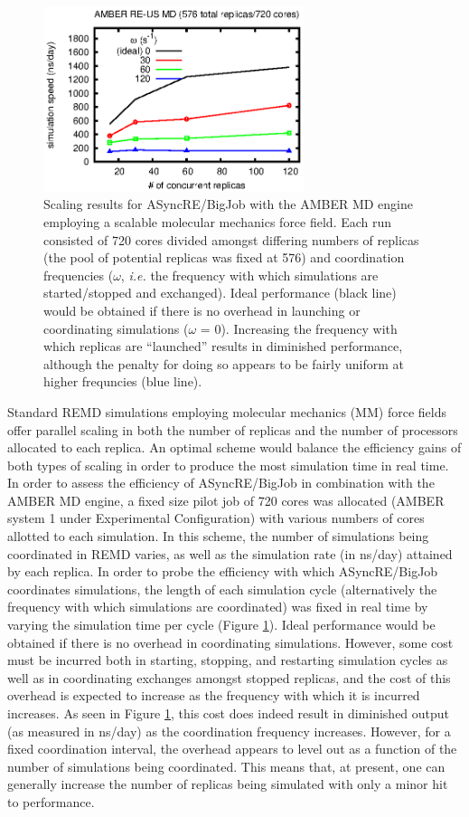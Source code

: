 \begin{figure}
\includegraphics[width=3in]{amber_data/amber_mm.eps}
\caption{
  Scaling results for ASyncRE/BigJob with the AMBER MD engine employing a
  scalable molecular mechanics force field. Each run consisted of 720 cores
  divided amongst differing numbers of replicas (the pool of potential 
  replicas was fixed at 576) and coordination frequencies ($\omega$, {\em i.e.}
  the frequency with which simulations are started/stopped and exchanged). 
  Ideal performance (black line) would be obtained if there is no overhead in 
  launching or coordinating simulations ($\omega$ = 0). Increasing the 
  frequency with which replicas are ``launched'' results in diminished 
  performance, although the penalty for doing so appears to be fairly uniform 
  at higher frequncies (blue line).
  \label{fig:amber_mm}  
}
\end{figure}

Standard REMD simulations employing molecular mechanics (MM) force fields offer 
parallel scaling in both the number of replicas and the number of processors 
allocated to each replica. An optimal scheme would balance the efficiency gains
of both types of scaling in order to produce the most simulation time in real 
time. In order to assess the efficiency of ASyncRE/BigJob in combination 
with the AMBER MD engine, a fixed size pilot job of 720 cores was allocated 
(AMBER system 1 under Experimental Configuration) with various numbers of cores
allotted to each simulation. In this scheme, the number of simulations being 
coordinated in REMD varies, as well as the simulation rate (in ns/day) attained
by each replica. In order to probe the efficiency with which ASyncRE/BigJob 
coordinates simulations, the length of each simulation cycle (alternatively the 
frequency with which simulations are coordinated) was fixed in real time by 
varying the simulation time per cycle (Figure \ref{fig:amber_mm}). Ideal
performance would be obtained if there is no overhead in coordinating 
simulations. However, some cost must be incurred both in starting, stopping,
and restarting simulation cycles as well as in coordinating exchanges amongst 
stopped replicas, and the cost of this overhead is expected to increase as the 
frequency with which it is incurred increases. As seen in Figure 
\ref{fig:amber_mm}, this cost does indeed result in diminished output (as 
measured in ns/day) as the coordination frequency increases. However, for a
fixed coordination interval, the overhead appears to level out as a function
of the number of simulations being coordinated. This means that, at present, 
one can generally increase the number of replicas being simulated with only a
minor hit to performance.

